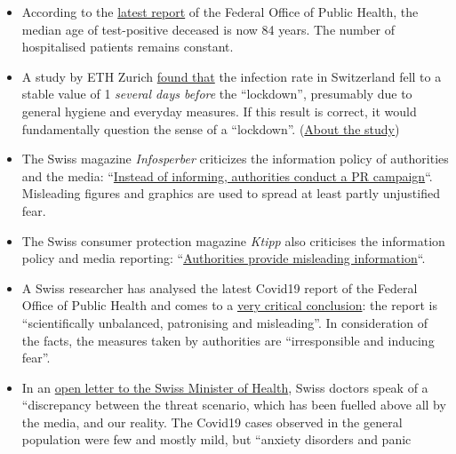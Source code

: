 \begin{itemize}
\tightlist
\item
  According to the
  \href{https://www.bag.admin.ch/bag/de/home/krankheiten/ausbrueche-epidemien-pandemien/aktuelle-ausbrueche-epidemien/novel-cov/situation-schweiz-und-international.html}{latest
  report} of the Federal Office of Public Health, the median age of
  test-positive deceased is now 84 years. The number of hospitalised
  patients remains constant.
\item
  A study by ETH Zurich
  \href{https://www.tagesanzeiger.ch/ansteckungsraten-flachten-bereits-vor-dem-lockdown-ab-809893127675}{found
  that} the infection rate in Switzerland fell to a stable value of 1
  \emph{several days before} the ``lockdown'', presumably due to general
  hygiene and everyday measures. If this result is correct, it would
  fundamentally question the sense of a ``lockdown''.
  (\href{https://bsse.ethz.ch/cevo/research/sars-cov-2/real-time-monitoring-in-switzerland.html}{About
  the study})
\item
  The Swiss magazine \emph{Infosperber} criticizes the information
  policy of authorities and the media:
  ``\href{https://www.infosperber.ch/Artikel/Gesundheit/Corona-Statt-zu-informieren-fuhren-Behorden-eine-PR-Kampagne}{Instead
  of informing, authorities conduct a PR campaign}``. Misleading figures
  and graphics are used to spread at least partly unjustified fear.
\item
  The Swiss consumer protection magazine \emph{Ktipp} also criticises
  the information policy and media reporting:
  ``\href{https://www.ktipp.ch/artikel/artikeldetail/behoerden-informieren-irrefuehrend/}{Authorities
  provide misleading information}``.
\item
  A Swiss researcher has analysed the latest Covid19 report of the
  Federal Office of Public Health and comes to a
  \href{https://covid-19-fakten.blogspot.com/2020/04/die-analyse-des-aktuellen.html}{very
  critical conclusion}: the report is ``scientifically unbalanced,
  patronising and misleading''. In consideration of the facts, the
  measures taken by authorities are ``irresponsible and inducing fear''.
\item
  In an \href{https://www.rontalpraxis.ch/aktuelles}{open letter to the
  Swiss Minister of Health}, Swiss doctors speak of a ``discrepancy
  between the threat scenario, which has been fuelled above all by the
  media, and our reality. The Covid19 cases observed in the general
  population were few and mostly mild, but ``anxiety disorders and panic

\end{itemize}
